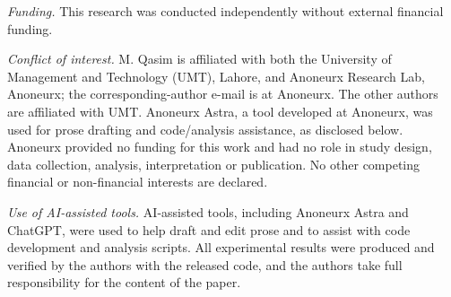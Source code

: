\documentclass[10pt,twocolumn,a4paper]{IEEEtran}
\begin{document}
\emph{Funding.} This research was conducted independently without external
financial funding.

\emph{Conflict of interest.} M. Qasim is affiliated with both the University of
Management and Technology (UMT), Lahore, and Anoneurx Research Lab, Anoneurx;
the corresponding-author e-mail is at Anoneurx. The other authors are
affiliated with UMT. Anoneurx Astra, a tool developed at Anoneurx, was used for
prose drafting and code/analysis assistance, as disclosed below. Anoneurx
provided no funding for this work and had no role in study design, data
collection, analysis, interpretation or publication. No other competing
financial or non-financial interests are declared.

\emph{Use of AI-assisted tools.} AI-assisted tools, including Anoneurx Astra
and ChatGPT, were used to help draft and edit prose and to assist with code
development and analysis scripts. All experimental results were produced and
verified by the authors with the released code, and the authors take full
responsibility for the content of the paper.
\end{document}
